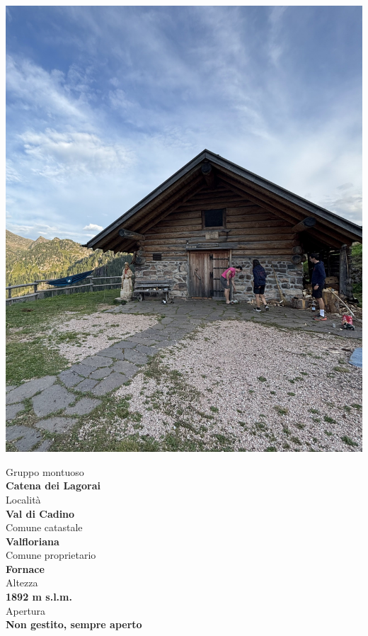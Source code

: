 \documentclass{article}
\begin{document}
\noindent
\begin{minipage}[t]{0.45\textwidth}
  \vspace{0pt} %
  \includegraphics[width=\linewidth]{images/bivacco.jpg}
\end{minipage}%
\hfill
\begin{minipage}[t]{0.5\textwidth}
  \vspace{0pt} %
  
  Gruppo montuoso\\
  \textbf{\large Catena dei Lagorai}
  \\[1em] %
  Località\\
  \textbf{\large Val di Cadino}
  \\[1em] %
  Comune catastale\\  
  \textbf{\large Valfloriana}
  \\[1em] %
  Comune proprietario\\  
  \textbf{\large Fornace}
  \\[1em] %
  Altezza\\  
  \textbf{\large 1892 m s.l.m.}
  \\[1em] %
  Apertura\\  
  \textbf{\large Non gestito, sempre aperto}

\end{minipage}
\end{document}
